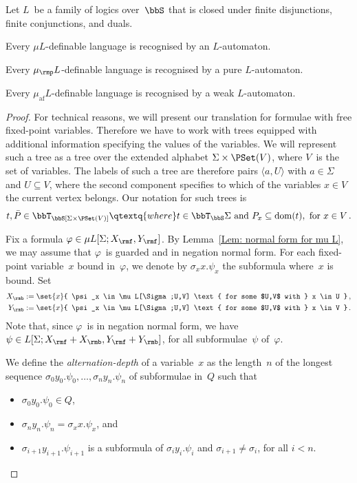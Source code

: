 \documentclass[10pt, fleqn]{scrartcl}
\DeclareRobustCommand*{\dom}{\qopname\relax o{dom}}
\newcommand*{\muaf}{\mu_{\mathrm{af}}}
\newcommand*{\mup}{\mu_\rmp}
\newcommand*{\?}{\kern .08em}
\begin{document}
\begin{Prop}\label{Prop: formula -> automaton}
Let $L$~be a family of logics over\/~$\bbS$ that is closed under finite disjunctions,
finite conjunctions, and duals.
\begin{enuma}
\item Every $\mu L$-definable language is recognised by an $L$-automaton.
\item Every $\mup L$-definable language is recognised by a pure $L$-automaton.
\item Every $\muaf L$-definable language is recognised by a weak $L$-automaton.
\end{enuma}
\end{Prop}
\begin{proof}
For technical reasons, we will present our translation for formulae with free fixed-point
variables. Therefore we have to work with trees equipped with additional information specifying
the values of the variables. We will represent such a tree as a tree over
the extended alphabet $\Sigma \times \PSet(V)$, where $V$~is the set of variables.
The labels of such a tree are therefore pairs $\langle a,U\rangle$ with $a \in \Sigma$
and $U \subseteq V$, where the second component specifies to which of the variables $x \in V$
the current vertex belongs. Our notation for such trees is
\begin{align*}
  t,\bar P \in \bbT_\bbS[\Sigma \times \PSet(V)]
  \qtextq{where}
  t \in \bbT_\bbS\Sigma \text{ and } P_x \subseteq \dom(t), \text{ for } x \in V\,.
\end{align*}

Fix a formula $\varphi \in \mu L[\Sigma;X_\rmf,Y_\rmf]$.
By Lemma~\ref{Lem: normal form for mu L}, we may assume that $\varphi$~is guarded and
in negation normal form.
For each fixed-point variable~$x$ bound in~$\varphi$, we denote by $\sigma_x x.\psi_x$
the subformula where~$x$ is bound.
Set
\begin{align*}
  X_\rmb &:= \set{ x }{ \psi_x \in \mu L[\Sigma;U,V] \text{ for some $U,V$ with } x \in U }\,, \\
  Y_\rmb &:= \set{ x }{ \psi_x \in \mu L[\Sigma;U,V] \text{ for some $U,V$ with } x \in V }\,.
\end{align*}
Note that, since $\varphi$~is in negation normal form, we have
$\psi \in L[\Sigma;X_\rmf + X_\rmb,Y_\rmf + Y_\rmb]$, for all subformulae~$\psi$ of~$\varphi$.

We define the \emph{alternation-depth} of a variable~$x$ as the length~$n$ of the
longest sequence $\sigma_0 y_0.\psi_0,\dots,\sigma_n y_n.\psi_n$ of subformulae in~$Q$ such that
\begin{itemize}
\item $\sigma_0 y_0.\psi_0 \in Q$,
\item $\sigma_n y_n.\psi_n = \sigma_x x.\psi_x$, and
\item $\sigma_{i+1} y_{i+1}.\psi_{i+1}$ is a subformula of $\sigma_i y_i.\psi_i$ and
  $\sigma_{i+1} \neq \sigma_i$, for all $i < n$.
\end{itemize}


\end{proof}
\end{document}
